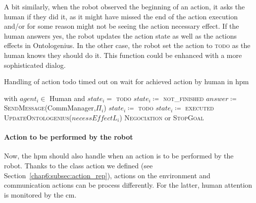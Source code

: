 \documentclass[a4paper,11pt,twoside]{StyleThese}
\begin{document}
A bit similarly, when the robot observed the beginning of an action, it asks the human if they did it, as it might have missed the end of the action execution and/or for some reason might not be seeing the action necessary effect. If the human answers yes, the robot updates the action state as well as the actions effects in Ontologenius. In the other case, the robot set the action to \textsc{todo} as the human knows they should do it. This function could be enhanced with a more sophisticated dialog. 
			
\begin{algorithm}[!htb]
	\caption{Handling of action todo timed out on wait for achieved action by human in \acrshort{hpm}}
	\label{chap6:algo:h_todo_conting_2}
	\begin{algorithmic}
		 with $agent_i \in$ Human and $state_i=$ \textsc{todo}
			\State $state_i\coloneqq$ \textsc{not\_finished} 
			\State $answer \coloneqq$ \textsc{SendMessage}(CommManager,$\Pi_i$)
				\State $state_i\coloneqq$ \textsc{todo} 
			\Else
				\State $state_i\coloneqq$ \textsc{executed} 
				\State \textsc{UpdateOntologenius($necessEffectL_i$)}
			\EndIf
		\Else
			\State \textsc{Negociation} or \textsc{StopGoal}
		\EndIf
		\EndFunction
	\end{algorithmic}
\end{algorithm}		

\paragraph{Action to be performed by the robot} Now, the \acrshort{hpm} should also handle when an action is to be performed by the robot. Thanks to the class action we defined (see Section~\ref{chap6:subsec:action_rep}), actions on the environment and communication actions can be process differently. For the latter, human attention is monitored by the \acrlong{cm}. 
\end{document}
